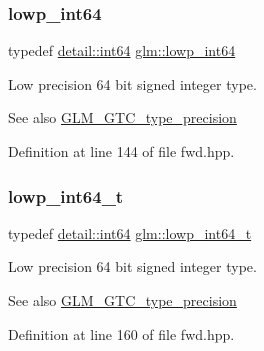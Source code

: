\subsubsection{\texorpdfstring{lowp\+\_\+int64}{lowp\_int64}}
{\footnotesize\ttfamily typedef \hyperlink{namespaceglm_1_1detail_a5b1c3227ec636c24a0676746381adfc8}{detail\+::int64} \hyperlink{group__gtc__type__precision_gab8a8e75af347592406e41b3ae2c0712b}{glm\+::lowp\+\_\+int64}}

Low precision 64 bit signed integer type. \begin{DoxySeeAlso}{See also}
\hyperlink{group__gtc__type__precision}{G\+L\+M\+\_\+\+G\+T\+C\+\_\+type\+\_\+precision} 
\end{DoxySeeAlso}


Definition at line 144 of file fwd.\+hpp.

\mbox{\label{group__gtc__type__precision_ga14d72e76d57c7f28eca8e933816c9fd6}} 
\subsubsection{\texorpdfstring{lowp\+\_\+int64\+\_\+t}{lowp\_int64\_t}}
{\footnotesize\ttfamily typedef \hyperlink{namespaceglm_1_1detail_a5b1c3227ec636c24a0676746381adfc8}{detail\+::int64} \hyperlink{group__gtc__type__precision_ga14d72e76d57c7f28eca8e933816c9fd6}{glm\+::lowp\+\_\+int64\+\_\+t}}

Low precision 64 bit signed integer type. \begin{DoxySeeAlso}{See also}
\hyperlink{group__gtc__type__precision}{G\+L\+M\+\_\+\+G\+T\+C\+\_\+type\+\_\+precision} 
\end{DoxySeeAlso}


Definition at line 160 of file fwd.\+hpp.

\mbox{\label{group__gtc__type__precision_gaf9e675b6392764242ae87eb179e9d3d6}} 
